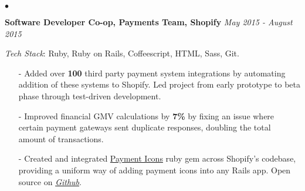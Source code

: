 \documentclass[11pt]{article}
\newenvironment{achievements}{\begin{list}{$\bullet$}{\topsep 0pt \itemsep -1.5pt \leftmargin 5pt}}{\vspace*{4pt}\end{list}}
\begin{document}
\begin{achievements}
\vspace{5pt}

\item \textbf{{\fontsize{9.5}{10}\selectfont Software Developer Co-op, Payments Team, Shopify}} \hfill \textit {May 2015 - August 2015}

\vspace{1pt}
\item[ ] \textit{Tech Stack}: Ruby, Ruby on Rails, Coffeescript, HTML, Sass, Git.
\vspace{2pt}

\begin{itemize}
\item[-]Added over \textbf{100} third party payment system integrations by automating addition of these systems to Shopify. Led project from early prototype to beta phase through test-driven development.
\vspace{2pt}
\item[-]Improved financial GMV calculations by \textbf{7\%} by fixing an issue where certain payment gateways sent duplicate responses, doubling the total amount of transactions.
\vspace{2pt}
\item[-]Created and integrated \href{https://github.com/activemerchant/payment_icons}{Payment Icons} ruby gem across Shopify's codebase, providing a uniform way of adding payment icons into any Rails app. Open source on \href{https://github.com/activemerchant/payment_icons}{\textit{Github}}.
\end{itemize}
\end{achievements}

\vspace{6pt}
\end{document}
